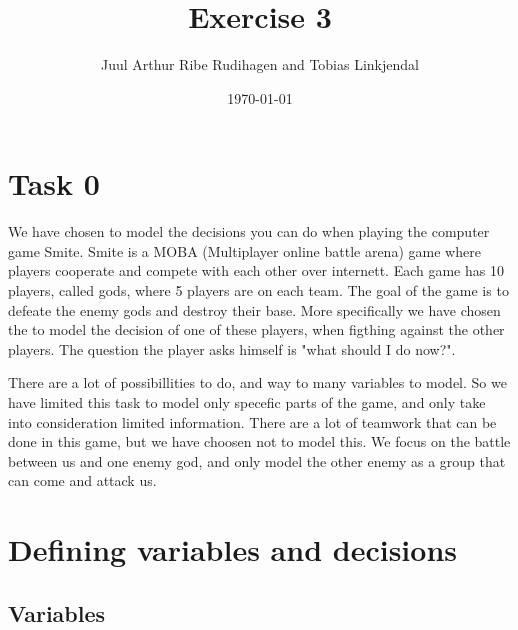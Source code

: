 \documentclass[titlepage]{article}
\author{Juul Arthur Ribe Rudihagen and Tobias Linkjendal}
\title{Exercise 3}
\date{\today}
\begin{document}
\maketitle


\tableofcontents

\newpage


\section{Task 0}
We have chosen to model the decisions you can do when playing the computer game Smite. Smite is a MOBA (Multiplayer online battle arena) game where players cooperate and compete with each other over internett. Each game has 10 players, called gods, where 5 players are on each team. The goal of the game is to defeate the enemy gods and destroy their base. More specifically we have chosen the to model the decision of one of these players, when figthing against the other players. The question the player asks himself is "what should I do now?".

There are a lot of possibillities to do, and way to many variables to model. So we have limited this task to model only specefic parts of the game, and only take into consideration limited information. There are a lot of teamwork that can be done in this game, but we have choosen not to model this. We focus on the battle between us and one enemy god, and only model the other enemy as a group that can come and attack us.

\newpage


\section{Defining variables and decisions}

\subsection{Variables}
\end{document}
